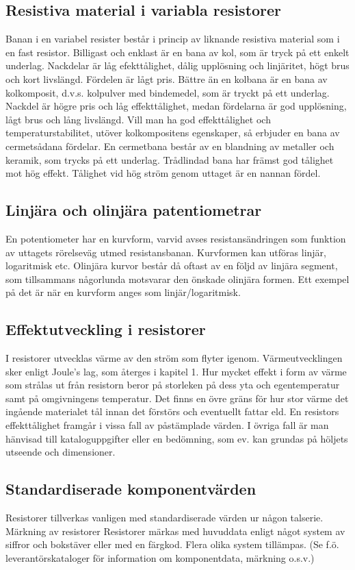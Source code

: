 \subsection{Resistiva material i variabla resistorer}

Banan i en variabel resister består i princip av liknande resistiva material som i en fast
resistor. Billigast och enklast är en bana av kol, som är tryck på ett enkelt underlag.
Nackdelar är låg efekttålighet, dålig upplösning och
linjäritet, högt brus och kort livslängd. Fördelen är lågt pris.
Bättre än en kolbana är en bana av kolkomposit, d.v.s. kolpulver med bindemedel,
som är tryckt på ett underlag. Nackdel är högre pris och låg effekttålighet, medan
fördelarna är god upplösning, lågt brus och lång livslängd.
Vill man ha god effekttålighet och temperaturstabilitet, utöver kolkompositens egenskaper,
så erbjuder en bana av cermetsådana fördelar. En cermetbana består av en
blandning av metaller och keramik, som trycks på ett underlag.
Trådlindad bana har främst god tålighet mot hög effekt. Tålighet vid hög ström genom
uttaget är en nannan fördel.

\subsection{Linjära och olinjära patentiometrar}

En potentiometer har en kurvform, varvid avses resistansändringen som funktion av
uttagets rörelseväg utmed resistansbanan. Kurvformen kan utföras linjär, logaritmisk
etc. Olinjära kurvor består då oftast av en följd av linjära segment, som tillsammans
någorlunda motsvarar den önskade olinjära formen. Ett exempel på det är när en kurvform
anges som linjär/logaritmisk.

\subsection{Effektutveckling i resistorer}
I resistorer utvecklas värme av den ström som flyter igenom. Värmeutvecklingen sker
enligt Joule's lag, som återges i kapitel 1. Hur mycket effekt i form av värme som
strålas ut från resistorn beror på storleken på
dess yta och egentemperatur samt på omgivningens temperatur. Det finns en övre
gräns för hur stor värme det ingående materialet tål innan det förstörs och eventuellt
fattar eld. En resistors effekttålighet framgår i vissa fall av påstämplade värden.
I övriga fall är man hänvisad till kataloguppgifter eller en bedömning, som ev. kan
grundas på höljets utseende och dimensioner.

\subsection{Standardiserade komponentvärden}

Resistorer tillverkas vanligen med standardiserade värden ur någon talserie.
Märkning av resistorer Resistorer märkas med huvuddata enligt
något system av siffror och bokstäver eller med en färgkod. Flera olika system tillämpas.
(Se f.ö. leverantörskataloger för information om komponentdata, märkning o.s.v.)

